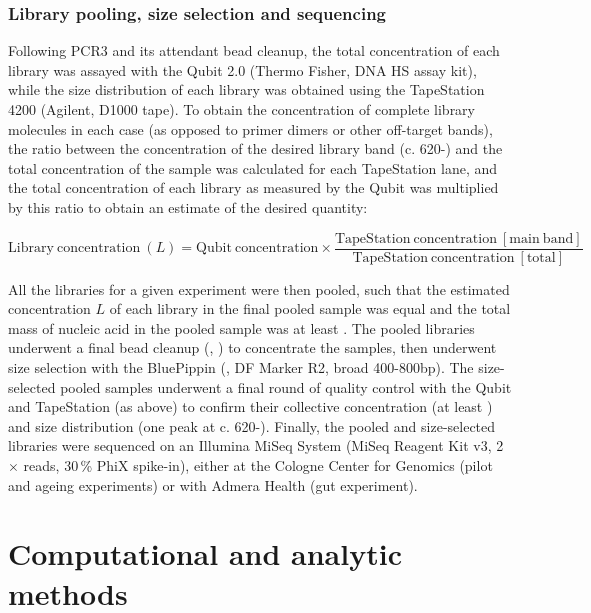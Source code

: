 \subsubsection{Library pooling, size selection and sequencing} 
\label{sec:methods_molec_igseq_seq}

Following PCR3 and its attendant bead cleanup, the total concentration of each library was assayed with the Qubit 2.0 (Thermo Fisher, DNA HS assay kit), while the size distribution of each library was obtained using the TapeStation 4200 (Agilent, D1000 tape). To obtain the concentration of complete library molecules in each case (as opposed to primer dimers or other off-target bands), the ratio between the concentration of the desired library band (c. 620-) and the total concentration of the sample was calculated for each TapeStation lane, and the total concentration of each library as measured by the Qubit was multiplied by this ratio to obtain an estimate of the desired quantity:

\begin{equation}
\mathrm{Library~concentration}~(L) = \mathrm{Qubit~concentration} \times \frac{\mathrm{TapeStation~concentration~[main~band]}}{\mathrm{TapeStation~concentration~[total]}}
\label{eq:library-conc}
\end{equation}

\noindent All the libraries for a given experiment were then pooled, such that the estimated concentration $L$ of each library in the final pooled sample was equal and the total mass of nucleic acid in the pooled sample was at least . The pooled libraries underwent a final bead cleanup (, ) to concentrate the samples, then underwent size selection with the BluePippin (,  DF Marker R2, broad 400-800bp). The size-selected pooled samples underwent a final round of quality control with the Qubit and TapeStation (as above) to confirm their collective concentration (at least ) and size distribution (one peak at c. 620-). Finally, the pooled and size-selected libraries were sequenced on an Illumina MiSeq System (MiSeq Reagent Kit v3, 2$\times$ reads, 30\,\% PhiX spike-in), either at the Cologne Center for Genomics (pilot and ageing experiments) or with Admera Health (gut experiment).

\section{Computational and analytic methods}
\label{sec:methods_comp}

